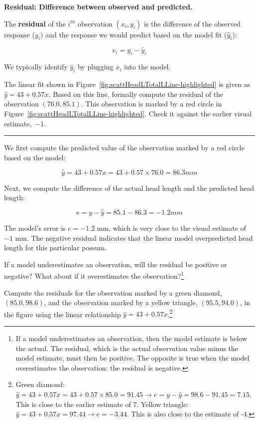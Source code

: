 \documentclass[
  10pt,
  openany]{book}
\theoremstyle{definition}
\theoremstyle{definition}
\theoremstyle{definition}
\theoremstyle{definition}
\theoremstyle{remark}
\begin{document}
\textbf{Residual: Difference between observed and predicted.}

The \textbf{residual} of the \(i^{th}\) observation \((x_i, y_i)\) is the difference of the observed response (\(y_i\)) and the response we would predict based on the model fit (\(\hat{y}_i\)):

\[e_i = y_i - \hat{y}_i\]

We typically identify \(\hat{y}_i\) by plugging \(x_i\) into the model.

The linear fit shown in Figure~\ref{fig:scattHeadLTotalLLine-highlighted} is given as \(\hat{y} = 43+0.57x\).
Based on this line, formally compute the residual of the observation
\((76.0, 85.1)\).
This observation is marked by a red circle in Figure~\ref{fig:scattHeadLTotalLLine-highlighted}.
Check it against the earlier visual estimate,~\(-1\).

\begin{center}\rule{0.5\linewidth}{0.5pt}\end{center}

We first compute the predicted value of the observation marked by a red circle based on the model:

\[\hat{y} = 43+0.57x = 43+0.57\times 76.0 = 86.3mm\]

Next, we compute the difference of the actual head length and the predicted head length:

\[e = y - \hat{y} = 85.1 -  86.3 = -1.2 mm\]

The model's error is \(e = -1.2\) mm, which is very close to the
visual estimate of \(-1\) mm. The negative residual indicates that the linear model overpredicted head length for this particular possum.

If a model underestimates an observation, will the residual be positive or negative? What about if it overestimates the observation?\footnote{If a model underestimates an observation, then the model estimate is below the actual. The residual, which is the actual observation value minus the model estimate, must then be positive. The opposite is true when the model overestimates the observation: the residual is negative.}

Compute the residuals for the observation marked by a green diamond, \((85.0, 98.6)\), and the observation marked by a yellow triangle, \((95.5, 94.0)\), in the figure using the linear relationship \(\hat{y} = 43 + 0.57x\).\footnote{Green diamond: \(\hat{y} = 43+0.57x = 43+0.57\times 85.0 = 91.45 \rightarrow e = y - \hat{y} = 98.6-91.45=7.15\). This is close to the earlier estimate of 7. Yellow triangle: \(\hat{y} = 43+0.57x = 97.44 \rightarrow e = -3.44\). This is also close to the estimate of -4.}
\end{document}
